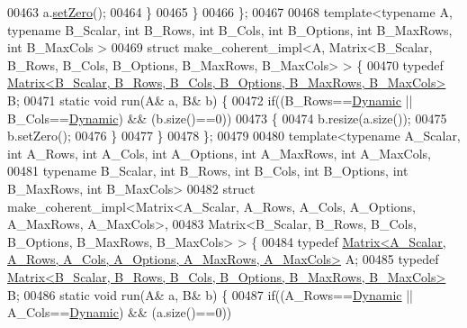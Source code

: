 \begin{DoxyCode}
00463       a.\hyperlink{class_eigen_1_1_plain_object_base_ac21ad5f989f320e46958b75ac8d9a1da}{setZero}();
00464     \}
00465   \}
00466 \};
00467 
00468 \textcolor{keyword}{template}<\textcolor{keyword}{typename} A, \textcolor{keyword}{typename} B\_Scalar, \textcolor{keywordtype}{int} B\_Rows, \textcolor{keywordtype}{int} B\_Cols, \textcolor{keywordtype}{int} B\_Options, \textcolor{keywordtype}{int} B\_MaxRows, \textcolor{keywordtype}{int} B\_MaxCols
      >
00469 \textcolor{keyword}{struct }make\_coherent\_impl<A, Matrix<B\_Scalar, B\_Rows, B\_Cols, B\_Options, B\_MaxRows, B\_MaxCols> > \{
00470   \textcolor{keyword}{typedef} \hyperlink{group___core___module_class_eigen_1_1_matrix}{Matrix<B\_Scalar, B\_Rows, B\_Cols, B\_Options, B\_MaxRows, B\_MaxCols>}
       B;
00471   \textcolor{keyword}{static} \textcolor{keywordtype}{void} run(A& a, B& b) \{
00472     \textcolor{keywordflow}{if}((B\_Rows==\hyperlink{namespace_eigen_ad81fa7195215a0ce30017dfac309f0b2}{Dynamic} || B\_Cols==\hyperlink{namespace_eigen_ad81fa7195215a0ce30017dfac309f0b2}{Dynamic}) && (b.size()==0))
00473     \{
00474       b.resize(a.size());
00475       b.setZero();
00476     \}
00477   \}
00478 \};
00479 
00480 \textcolor{keyword}{template}<\textcolor{keyword}{typename} A\_Scalar, \textcolor{keywordtype}{int} A\_Rows, \textcolor{keywordtype}{int} A\_Cols, \textcolor{keywordtype}{int} A\_Options, \textcolor{keywordtype}{int} A\_MaxRows, \textcolor{keywordtype}{int} A\_MaxCols,
00481          \textcolor{keyword}{typename} B\_Scalar, \textcolor{keywordtype}{int} B\_Rows, \textcolor{keywordtype}{int} B\_Cols, \textcolor{keywordtype}{int} B\_Options, \textcolor{keywordtype}{int} B\_MaxRows, \textcolor{keywordtype}{int} B\_MaxCols>
00482 \textcolor{keyword}{struct }make\_coherent\_impl<Matrix<A\_Scalar, A\_Rows, A\_Cols, A\_Options, A\_MaxRows, A\_MaxCols>,
00483                              Matrix<B\_Scalar, B\_Rows, B\_Cols, B\_Options, B\_MaxRows, B\_MaxCols> > \{
00484   \textcolor{keyword}{typedef} \hyperlink{group___core___module_class_eigen_1_1_matrix}{Matrix<A\_Scalar, A\_Rows, A\_Cols, A\_Options, A\_MaxRows, A\_MaxCols>}
       A;
00485   \textcolor{keyword}{typedef} \hyperlink{group___core___module_class_eigen_1_1_matrix}{Matrix<B\_Scalar, B\_Rows, B\_Cols, B\_Options, B\_MaxRows, B\_MaxCols>}
       B;
00486   \textcolor{keyword}{static} \textcolor{keywordtype}{void} run(A& a, B& b) \{
00487     \textcolor{keywordflow}{if}((A\_Rows==\hyperlink{namespace_eigen_ad81fa7195215a0ce30017dfac309f0b2}{Dynamic} || A\_Cols==\hyperlink{namespace_eigen_ad81fa7195215a0ce30017dfac309f0b2}{Dynamic}) && (a.size()==0))

\end{DoxyCode}
